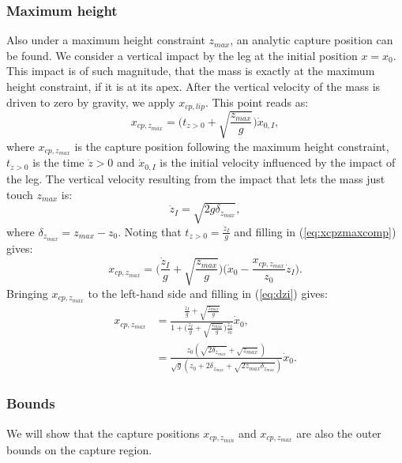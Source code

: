 \documentclass[letterpaper, 10 pt, conference]{ieeeconf}  %
\newcommand{\zmin}{z_{min}}
\newcommand{\zmax}{z_{max}}
\begin{document}
\subsubsection{Maximum height} Also under a maximum height constraint $\zmax$, an analytic capture position can be found. We consider a vertical impact by the leg at the initial position $x=x_0$. This impact is of such magnitude, that the mass is exactly at the maximum height constraint, if it is at its apex. After the vertical velocity of the mass is driven to zero by gravity, we apply $x_{cp,lip}$. This point reads as:
\begin{equation}
	x_{cp,\zmax} =\bigg(t_{\dot{z}>0} + \sqrt{\frac{\zmax}{g}}\bigg)\dot{x}_{0,I},
	\label{eq:xcpzmaxcomp}
\end{equation} 
where $x_{cp,\zmax}$ is the capture position following the maximum height constraint, $t_{\dot{z}>0}$ is the time $\dot{z}>0$ and $\dot{x}_{0,I}$ is the initial velocity influenced by the impact of the leg. The vertical velocity resulting from the impact that lets the mass just touch $\zmax$ is:
\begin{equation}
	\dot{z}_{I} = \sqrt{2g\delta_{\zmax}},
	\label{eq:dzi}
\end{equation}
where $\delta_{\zmax}=\zmax-z_0$. Noting that $t_{\dot{z}>0} = \frac{\dot{z}_I}{g}$ and filling in (\ref{eq:xcpzmaxcomp}) gives:
\begin{equation}
	x_{cp,\zmax} = \bigg(\frac{\dot{z}_I}{g}+\sqrt{\frac{\zmax}{g}}\bigg)\bigg(\dot{x}_0-\frac{x_{cp,\zmax}}{z_0}\dot{z}_I\bigg).
\end{equation}
Bringing $x_{cp,\zmax}$ to the left-hand side and filling in (\ref{eq:dzi}) gives:
\begin{align}
	x_{cp,\zmax}&=\frac{\frac{\dot{z}_I}{g}+\sqrt{\frac{z_{max}}{g}}}{1+\Big(\frac{\dot{z}_I}{g}+\sqrt{\frac{z_{max}}{g}}\Big)\frac{\dot{z}_I}{z_0}}\dot{x}_0,\\
	&=\frac{z_0(\sqrt{2\delta_{\zmax}}+\sqrt{\zmax})}{\sqrt{g}(z_0 + 2\delta_{\zmax} + \sqrt{2\zmax \delta_{\zmax}})}\dot{x}_0.
\end{align}
\subsubsection{Bounds} We will show that the capture positions $x_{cp,\zmin}$ and $x_{cp,\zmax}$ are also the outer bounds on the capture region.
\end{document}
